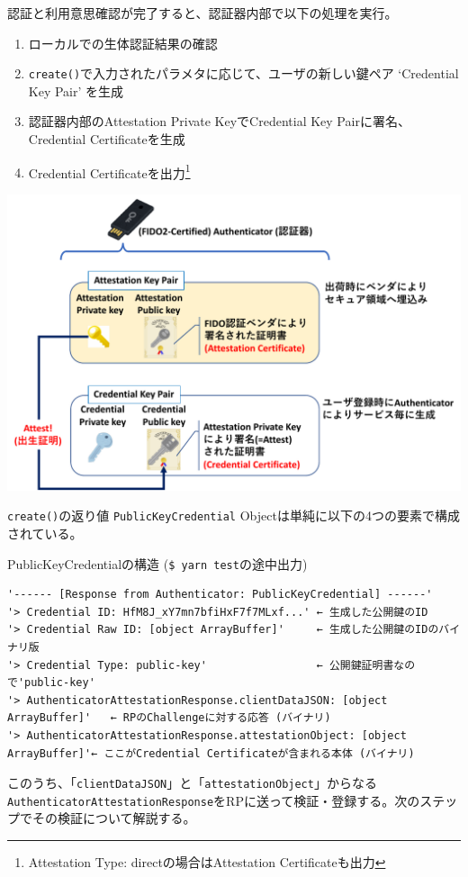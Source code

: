\documentclass[12pt,dvipdfmx,uplatex]{beamer}
\begin{document}
\begin{frame}
\small
認証と利用意思確認が完了すると、認証器内部で以下の処理を実行。
\begin{enumerate}
\setlength{\itemsep}{0ex}
 \item ローカルでの生体認証結果の確認
 \item \texttt{create()}で入力されたパラメタに応じて、ユーザの新しい鍵ペア `Credential Key Pair' を生成
 \item 認証器内部のAttestation Private KeyでCredential Key Pairに署名、Credential Certificateを生成
 \item Credential Certificateを出力\footnote[frame]{\scriptsize Attestation Type: directの場合はAttestation Certificateも出力}
\end{enumerate}
\begin{center}
\includegraphics[width=0.6\linewidth]{Figs/webauthn-attestation.pdf}
\end{center}
\end{frame}

\begin{frame}[fragile]
\small
\texttt{create()}の返り値 \texttt{PublicKeyCredential} Objectは単純に以下の4つの要素で構成されている。
\begin{exampleblock}{\scriptsize PublicKeyCredentialの構造 (\texttt{\$ yarn test}の途中出力)}
{\tiny
\begin{verbatim}
'------ [Response from Authenticator: PublicKeyCredential] ------'
'> Credential ID: HfM8J_xY7mn7bfiHxF7f7MLxf...' ← 生成した公開鍵のID
'> Credential Raw ID: [object ArrayBuffer]'     ← 生成した公開鍵のIDのバイナリ版
'> Credential Type: public-key'                 ← 公開鍵証明書なので'public-key'
'> AuthenticatorAttestationResponse.clientDataJSON: [object ArrayBuffer]'   ← RPのChallengeに対する応答 (バイナリ)
'> AuthenticatorAttestationResponse.attestationObject: [object ArrayBuffer]'← ここがCredential Certificateが含まれる本体 (バイナリ)
\end{verbatim}
}
\end{exampleblock}

このうち、「\texttt{clientDataJSON}」と「\texttt{attestationObject}」からなる\texttt{AuthenticatorAttestationResponse}をRPに送って検証・登録する。次のステップでその検証について解説する。


\end{frame}
\end{document}
